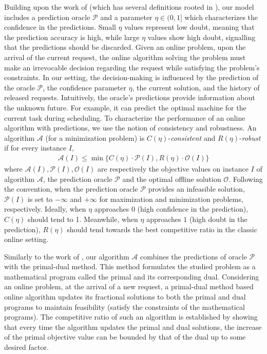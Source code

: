 Building upon the work of \cite{BamasMaggiori20:The-Primal-Dual-method} (which has several definitions rooted in \cite{LykourisVassilvtiskii18:Competitive-caching,KumarPurohit18:Improving-online}), our model includes a prediction oracle $\mathcal{P}$ and a parameter $\eta \in (0,1]$ which characterizes the confidence in the predictions. Small $\eta$ values represent low doubt, meaning that the prediction accuracy is high, while large $\eta$ values show high doubt, signalling that the predictions should be discarded. Given an online problem, upon the arrival of the current request, the online algorithm solving the problem must make an irrevocable decision regarding the request while satisfying the problem's constraints. In our setting, the decision-making is influenced by the prediction of the oracle $\mathcal{P}$, the confidence parameter $\eta$, the current solution, and the history of released requests. Intuitively, the oracle's predictions provide information about the unknown future. For example, it can predict the optimal machine for the current task during scheduling. To characterize the performance of an online algorithm with predictions, we use the notion of consistency and robustness. An algorithm $\mathcal{A}$ (for a minimization problem) is $C(\eta)$-\emph{consistent} and $R(\eta)$-\emph{robust} if for every instance $I$,
%
\begin{align*}
    \mathcal{A}(I) 	\leq 	\min\{C(\eta) \cdot \mathcal{P}(I), R(\eta) \cdot \mathcal{O}(I) \}  %
\end{align*}
%
where $\mathcal{A}(I), \mathcal{P}(I), \mathcal{O}(I)$ are respectively the objective values on instance $I$ of algorithm $\mathcal{A}$, the prediction oracle $\mathcal{P}$ and the optimal offline solution $\mathcal{O}$. Following the convention, when the prediction oracle $\mathcal{P}$ provides an infeasible solution, $\mathcal{P}(I)$ is set to $-\infty$ and $+\infty$ for maximization and minimization problems, respectively. Ideally, when $\eta$ approaches $0$ (high confidence in the prediction), $C(\eta)$ should tend to 1. Meanwhile, when $\eta$ approaches $1$ (high doubt in the prediction), $R(\eta)$ should tend towards the best competitive ratio in the classic online setting.

Similarly to the work of \cite{BamasMaggiori20:The-Primal-Dual-method}, our algorithm $\mathcal{A}$ combines the predictions of oracle $\mathcal{P}$ with the primal-dual method. This method formulates the studied problem as a mathematical program called the primal and its corresponding dual. Considering an online problem, at the arrival of a new request, a primal-dual method based online algorithm updates its fractional solutions to both the primal and dual programs to maintain feasibility (satisfy the constraints of the mathematical programs). The competitive ratio of such an algorithm is established by showing that every time the algorithm updates the primal and dual solutions, the increase of the primal objective value can be bounded by that of the dual up to some desired factor.

